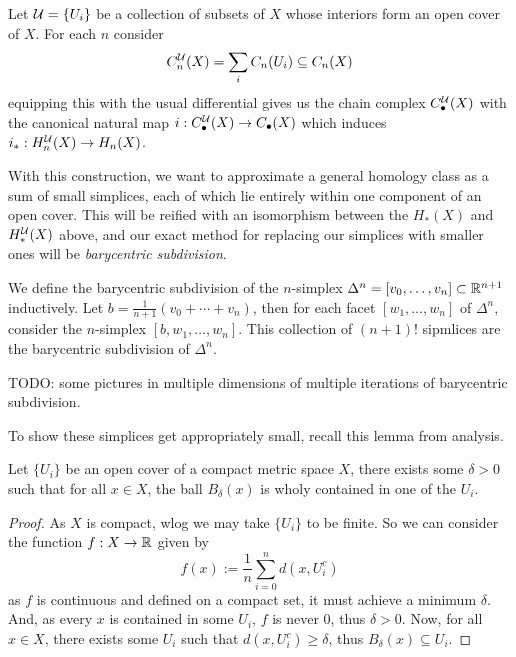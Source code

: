 \documentclass{article}
\begin{document}
\begin{definition}
    Let $\mathcal{U}=\{U_i\}$ be a collection of subsets of $X$ whose interiors form an open cover of $X$. For each $n$ consider \[
    C^{\mathcal{U}}_n(X) = \sum_iC_n(U_i) \subseteq C_n(X)
    \] equipping this with the usual differential gives us the chain complex $C_\bullet^{\mathcal{U}}(X)$ with the canonical natural map $i:C^{\mathcal{U}}_\bullet(X)\rightarrow C_\bullet(X)$ which induces $i_*:H_n^{\mathcal{U}}(X)\rightarrow H_n(X)$.
\end{definition}

With this construction, we want to approximate a general homology class as a sum of small simplices, each of which lie entirely within one component of an open cover. This will be reified with an isomorphism between the $H_*(X)$ and $H_*^{\mathcal{U}}(X)$ above, and our exact method for replacing our simplices with smaller ones will be \textit{barycentric subdivision}.

We define the barycentric subdivision of the $n$-simplex $\Delta^n=[v_0,\ldots,v_n]\subset \mathbb{R}^{n+1}$ inductively. Let $b=\frac{1}{n+1}(v_0+\cdots+v_n)$, then for each facet $[w_1,\ldots,w_n]$ of $\Delta^n$, consider the $n$-simplex $[b,w_1,\ldots,w_n]$. This collection of $(n+1)!$ sipmlices are the barycentric subdivision of $\Delta^n$.

TODO: some pictures in multiple dimensions of multiple iterations of barycentric subdivision.

To show these simplices get appropriately small, recall this lemma from analysis.

\begin{proposition}
    Let $\{U_i\}$ be an open cover of a compact metric space $X$, there exists some $\delta>0$ such that for all $x\in X$, the ball $B_\delta(x)$ is wholy contained in one of the $U_i$.
    \begin{proof}
        As $X$ is compact, wlog we may take $\{U_i\}$ to be finite. So we can consider the function $f:X\rightarrow \mathbb{R}$ given by \[
        f(x) := \frac{1}{n}\sum_{i=0}^nd(x,U_i^c)
        \] as $f$ is continuous and defined on a compact set, it must achieve a minimum $\delta$. And, as every $x$ is contained in some $U_i$, $f$ is never $0$, thus $\delta>0$. Now, for all $x\in X$, there exists some $U_i$ such that $d(x,U_i^c)\geq\delta$, thus $B_\delta(x)\subseteq U_i$.
    \end{proof}
\end{proposition}
\end{document}
